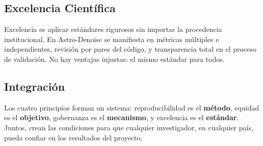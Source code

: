 \subsection{Excelencia Científica}

Excelencia es aplicar estándares rigurosos sin importar la procedencia institucional. En Astro-Denoise se manifiesta en métricas múltiples e independientes, revisión por pares del código, y transparencia total en el proceso de validación. No hay ventajas injustas: el mismo estándar para todos.

\subsection{Integración}

Los cuatro principios forman un sistema: reproducibilidad es el \textbf{método}, equidad es el \textbf{objetivo}, gobernanza es el \textbf{mecanismo}, y excelencia es el \textbf{estándar}. Juntos, crean las condiciones para que cualquier investigador, en cualquier país, pueda confiar en los resultados del proyecto.
